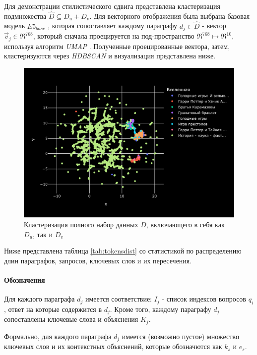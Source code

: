 Для демонстрации стилистического сдвига  представлена кластеризация подмножества $\hat{D} \subseteq D_u + D_v$. Для векторного отображения была выбрана 
базовая модель $E5_{base}$ \cite{e5}, которая сопоставляет каждому параграфу $d_j \in \hat{D}$ - вектор $\vec{v}_j \in \Re^{768}$, который сначала 
проецируется на под-пространство $\Re^{768} \mapsto \Re^{10}$, используя алгоритм \textit{UMAP} \cite{UMAP}. Полученные проецированные вектора, затем, 
кластеризуются через \textit{HDBSCAN} \cite{HDBSCAN} и визуализация представлена ниже.

\begin{figure}[ht]
    \centering
    \includegraphics[width=\columnwidth]{figures/clustering-e5-base.png} %
    \caption{Кластеризация полного набор данных $D$, включающего в себя как $D_u$,  так и $D_v$}
    \label{fig:clustering-e5-base}
\end{figure}

Ниже представлена таблица \eqref{tab:tokensdist} со статистикой по распределению длин параграфов, запросов, ключевых слов и их пересечения.

\paragraph{Обозначения}
Для каждого параграфа $d_j$ имеется соответствие: $I_j$ - список индексов вопросов $q_i$, ответ на которые содержится в $d_j$. 
Кроме того, каждому параграфу $d_j$ сопоставлены ключевые слова и объяснения $K_j$.

Формально, для каждого параграфа $d_j$ имеется (возможно пустое) множество ключевых слов и их контекстных объяснений, которые обозначются как 
$k_s$ и $e_s$.

